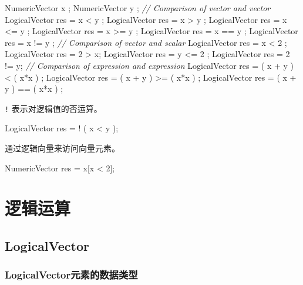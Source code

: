 \documentclass[]{ctexbook}
\newenvironment{Shaded}{\begin{snugshade}}{\end{snugshade}}
\newcommand{\DecValTok}[1]{\textcolor[rgb]{0.00,0.00,0.81}{#1}}
\newcommand{\CommentTok}[1]{\textcolor[rgb]{0.56,0.35,0.01}{\textit{#1}}}
\newcommand{\NormalTok}[1]{#1}
\begin{document}
\begin{Shaded}
\begin{Highlighting}[]
\NormalTok{NumericVector x ;}
\NormalTok{NumericVector y ;}
\CommentTok{// Comparison of vector and vector}
\NormalTok{LogicalVector res = x < y ;}
\NormalTok{LogicalVector res = x > y ;}
\NormalTok{LogicalVector res = x <= y ;}
\NormalTok{LogicalVector res = x >= y ;}
\NormalTok{LogicalVector res = x == y ;}
\NormalTok{LogicalVector res = x != y ;}
\CommentTok{// Comparison of vector and scalar}
\NormalTok{LogicalVector res = x < }\DecValTok{2}\NormalTok{ ;}
\NormalTok{LogicalVector res = }\DecValTok{2}\NormalTok{ > x;}
\NormalTok{LogicalVector res = y <= }\DecValTok{2}\NormalTok{ ;}
\NormalTok{LogicalVector res = }\DecValTok{2}\NormalTok{ != y;}
\CommentTok{// Comparison of expression and expression}
\NormalTok{LogicalVector res = ( x + y ) < ( x*x ) ;}
\NormalTok{LogicalVector res = ( x + y ) >= ( x*x ) ;}
\NormalTok{LogicalVector res = ( x + y ) == ( x*x ) ;}
\end{Highlighting}
\end{Shaded}

\texttt{!} 表示对逻辑值的否运算。

\begin{Shaded}
\begin{Highlighting}[]
\NormalTok{LogicalVector res = ! ( x < y );}
\end{Highlighting}
\end{Shaded}

通过逻辑向量来访问向量元素。

\begin{Shaded}
\begin{Highlighting}[]
\NormalTok{NumericVector res = x[x < }\DecValTok{2}\NormalTok{];}
\end{Highlighting}
\end{Shaded}

\chapter{逻辑运算}\label{Logical-operations}

\section{LogicalVector}\label{LogicalVector}

\subsection{LogicalVector元素的数据类型}\label{LogicalVector-elements}
\end{document}

